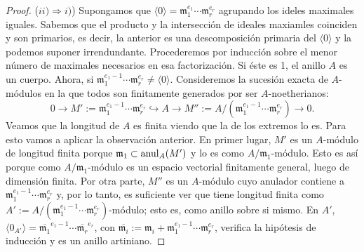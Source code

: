 \documentclass[../main.tex]{subfiles}
\begin{document}
\begin{proof}
($ii)\Rightarrow i)$) Supongamos que $\langle 0\rangle=\mathfrak{m}_1^{e_1}\cdots\mathfrak{m}_r^{e_r}$ agrupando los ideles maximales iguales. Sabemos que el producto y la intersección de ideales maxiamles coinciden y son primarios, es decir, la anterior es una descomposición primaria del $\langle 0\rangle$ y la podemos suponer irrendundante. Procederemos por inducción sobre el menor número de maximales necesarios en esa factorización. Si éste es 1, el anillo $A$ es un cuerpo. Ahora, si $\mathfrak{m}_1^{e_1-1}\cdots\mathfrak{m}_r^{e_r}\neq\langle 0\rangle.$ Consideremos la sucesión exacta de $A$-módulos en la que todos son finitamente generados por ser $A$-noetherianos:
$$0\rightarrow M':=\mathfrak{m}_1^{e_1-1}\cdots\mathfrak{m}_r^{e_r}\hookrightarrow A\rightarrow M'':=A/(\mathfrak{m}_1^{e_1-1}\cdots\mathfrak{m}_r^{e_r})\rightarrow 0.$$
Veamos que la longitud de $A$ es finita viendo que la de los extremos lo es. Para esto vamos a aplicar la observación anterior. En primer lugar, $M'$ es un $A$-módulo de longitud finita porque $\mathfrak{m}_1\subset\operatorname{anul}_A(M')$ y lo es como $A/\mathfrak{m}_1$-módulo. Esto es así porque como $A/\mathfrak{m}_1$-módulo es un espacio vectorial finitamente general, luego de dimensión finita. Por otra parte, $M''$ es un $A$-módulo cuyo anulador contiene a $\mathfrak{m}_1^{e_1-1}\cdots\mathfrak{m}_r^{e_r}$ y, por lo tanto, es suficiente ver que tiene longitud finita como $A':=A/(\mathfrak{m}_1^{e_1-1}\cdots\mathfrak{m}_r^{e_r})$-módulo; esto es, como anillo sobre si mismo. En $A'$, $\langle 0_{A'}\rangle=\overline{\mathfrak{m}_1}^{e_1-1}\cdots\overline{\mathfrak{m}_r}^{e_r}$, con $\overline{\mathfrak{m}_i}:=\mathfrak{m}_i+\mathfrak{m}_1^{e_1-1}\cdots\mathfrak{m}_r^{e_r}$, verifica la hipótesis de inducción y es un anillo artiniano.
\end{proof}
\end{document}
